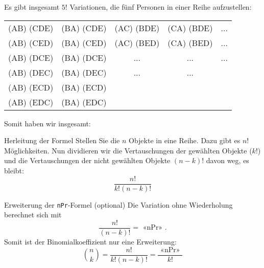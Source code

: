 Es gibt insgesamt $5!$ Variationen, die fünf Personen in einer Reihe
aufzustellen:

\begin{tabular}{c|c||c|c||c}\hline
  (AB) (CDE) & (BA) (CDE) & (AC) (BDE) & (CA) (BDE) & ...\\
  (AB) (CED) & (BA) (CED) & (AC) (BED) & (CA) (BED) & ...\\
  (AB) (DCE) & (BA) (DCE) & ... & ...       & ...\\
  (AB) (DEC) & (BA) (DEC) & ... & ...       & \\
  (AB) (ECD) & (BA) (ECD) & & & \\
  (AB) (EDC) & (BA) (EDC) & & & \\\hline
\end{tabular}


\noTRAINER{\vspace{2cm}}

  Somit haben wir insgesamt:


\begin{bemerkung}{Herleitung der Formel}{}
Stellen Sie die $n$ Objekte in eine Reihe. Dazu gibt
es $n!$ Möglichkeiten. Nun dividieren wir die Vertauschungen der
gewählten Objekte ($k!$) und die Vertauschungen der nicht gewählten
Objekte $(n-k)!$ davon weg, es bleibt: $$\frac{n!}{k!(n-k)!}$$
\end{bemerkung}

\begin{bemerkung}{Erweiterung der \texttt{nPr}-Formel (optional)}{}
  Die Variation ohne Wiederholung berechnet sich mit
  $$\frac{n!}{(n-k)!} = \text{ «nPr» }.$$
  Somit ist der Binomialkoeffizient nur eine Erweiterung:
  $${n \choose k} = \frac{n!}{k!(n-k)!} = \frac{\text{ «nPr» }}{k!}$$
  \end{bemerkung}
\newpage
